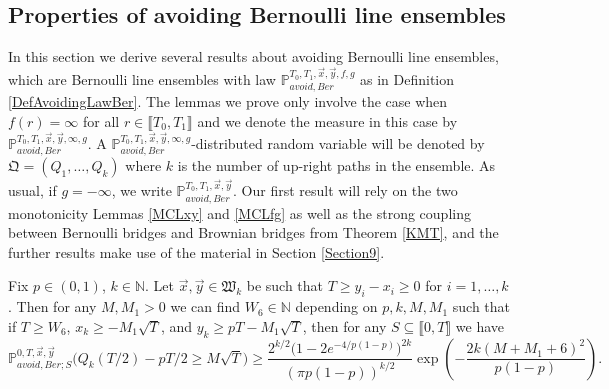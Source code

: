 %
\subsection{Properties of avoiding Bernoulli line ensembles}\label{Section3.3}  In this section we derive several results about avoiding Bernoulli line ensembles, which are Bernoulli line ensembles with law $\mathbb{P}_{avoid, Ber}^{T_0,T_1, \vec{x}, \vec{y}, f, g}$ as in Definition \ref{DefAvoidingLawBer}. The lemmas we prove only involve the case when $f(r) = \infty$ for all $r \in \llbracket T_0, T_1 \rrbracket$ and we denote the measure in this case by $\mathbb{P}_{avoid, Ber}^{T_0,T_1, \vec{x}, \vec{y}, \infty, g}$. A $\mathbb{P}_{avoid, Ber}^{T_0,T_1, \vec{x}, \vec{y}, \infty, g}$-distributed random variable will be denoted by $\mathfrak{Q} = (Q_1, \dots, Q_k)$ where $k$ is the number of up-right paths in the ensemble. As usual, if $g=-\infty$, we write $\mathbb{P}_{avoid, Ber}^{T_0,T_1, \vec{x}, \vec{y}}$. Our first result will rely on the two monotonicity Lemmas \ref{MCLxy} and \ref{MCLfg} as well as the strong coupling between Bernoulli bridges and Brownian bridges from Theorem \ref{KMT}, and the further results make use of the material in Section \ref{Section9}.


\begin{lemma}\label{prob19}
	Fix $p\in(0,1)$, $k\in\mathbb{N}$. Let $\vec{x},\vec{y}\in\mathfrak{W}_k$ be such that $T \geq y_i - x_i \geq 0$ for $i=1,\dots,k$. Then for any $M,M_1 > 0$ we can find $W_6\in\mathbb{N}$ depending on $p,k,M,M_1$ such that if $T\geq W_6$, $x_k \geq - M_1\sqrt{T}$, and $y_k \geq pT - M_1\sqrt{T}$, then for any $S\subseteq \llbracket 0,T\rrbracket$ we have
	\begin{equation}\label{19ineq}
	\mathbb{P}^{0,T,\vec{x},\vec{y}}_{avoid, Ber; S}\Big(Q_k(T/2) - pT/2 \geq M\sqrt{T}\Big) \geq \frac{2^{k/2}\big(1-2e^{-4/p(1-p)}\big)^{2k}}{(\pi p(1-p))^{k/2}}\exp\left(-\frac{2k(M+M_1+6)^2}{p(1-p)}\right).
	\end{equation}
\end{lemma}

